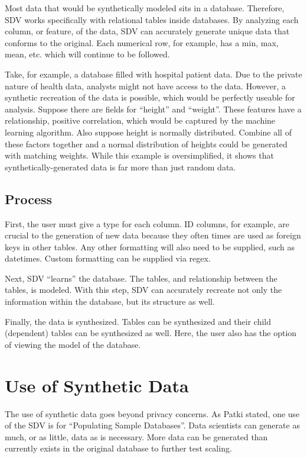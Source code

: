 Most data that would be synthetically modeled sits in a database. Therefore, SDV works specifically with relational tables inside databases. By analyzing each column, or feature, of the data, SDV can accurately generate unique data that conforms to the original. Each numerical row, for example, has a min, max, mean, etc. which will continue to be followed.

Take, for example, a database filled with hospital patient data. Due to the private nature of health data, analysts might not have access to the data. However, a synthetic recreation of the data is possible, which would be perfectly useable for analysis. Suppose there are fields for ``height'' and ``weight''. These features have a relationship, positive correlation, which would be captured by the machine learning algorithm. Also suppose height is normally distributed. Combine all of these factors together and a normal distribution of heights could be generated with matching weights. While this example is oversimplified, it shows that synthetically-generated data is far more than just random data.

\subsection{Process}

First, the user must give a type for each column. ID columns, for example, are crucial to the generation of new data because they often times are used as foreign keys in other tables. Any other formatting will also need to be supplied, such as datetimes. Custom formatting can be supplied via regex.

Next, SDV ``learns'' the database. The tables, and relationship between the tables, is modeled. With this step, SDV can accurately recreate not only the information within the database, but its structure as well.

Finally, the data is synthesized. Tables can be synthesized and their child (dependent) tables can be synthesized as well. Here, the user also has the option of viewing the model of the database.


\section{Use of Synthetic Data}

The use of synthetic data goes beyond privacy concerns. As Patki stated, one use of the SDV is for ``Populating Sample Databases''\cite{}. Data scientists can generate as much, or as little, data as is necessary. More data can be generated than currently exists in the original database to further test scaling.

